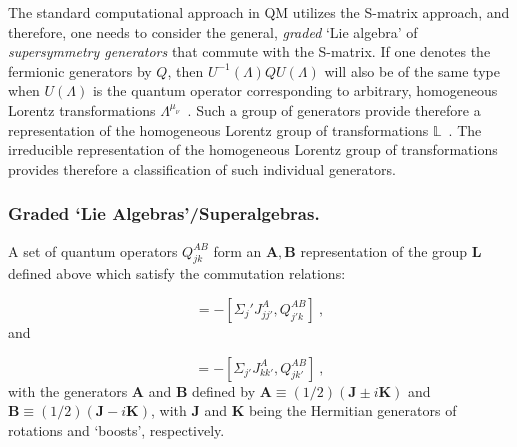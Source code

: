 \documentclass[12pt]{article}
\theoremstyle{plain}
\theoremstyle{definition}
\numberwithin{equation}{section}
\newcommand{\med}{\medbreak}
\newcommand{\<}{{\langle}}
\begin{document}
\med
The standard computational approach in QM utilizes the S-matrix
approach, and therefore, one needs to consider the general,
\emph{graded} `Lie algebra' of \emph{supersymmetry generators} that
commute with the S-matrix. If one denotes the fermionic generators
by $Q$, then $U^{-1}(\Lambda)Q U(\Lambda)$ will also be of the
same type when $U(\Lambda)$ is the quantum operator corresponding
to arbitrary, homogeneous Lorentz transformations $\Lambda^{\mu
_\nu}$~. Such a group of generators provide therefore a
representation of the homogeneous Lorentz group of transformations
$ \mathbb{L}$~. The irreducible representation of the homogeneous
Lorentz group of transformations provides therefore a
classification of such individual generators.

\subsubsection{Graded `Lie Algebras'/Superalgebras.}

A set of quantum operators $Q^{AB}_{jk}$ form an $\mathbf A,
\mathbf B$ representation of the group $\mathbf L$ defined above
which satisfy the commutation relations:

\begin{equation}
[\mathbf{A},Q^{AB}_{jk}] = -[\Sigma _j' J^A _{j j'}, Q^{AB}_{j'k}]
~,
\end{equation}
and

\begin{equation}
[\mathbf{B},Q^{AB}_{jk}] = -[\Sigma _{j'} J^A _{k k'},
Q^{AB}_{jk'}] ~,
\end{equation}
with the generators $\mathbf{A}$ and $\mathbf{B}$ defined by
$\mathbf{A}\equiv (1/2)(\mathbf{J} \pm i\mathbf{K})$ and
$\mathbf{B} \equiv (1/2)(\mathbf{J }- i\mathbf{K})$, with
$\mathbf{J}$ and $\mathbf{K}$ being the Hermitian generators of
rotations and `boosts', respectively.
\end{document}
